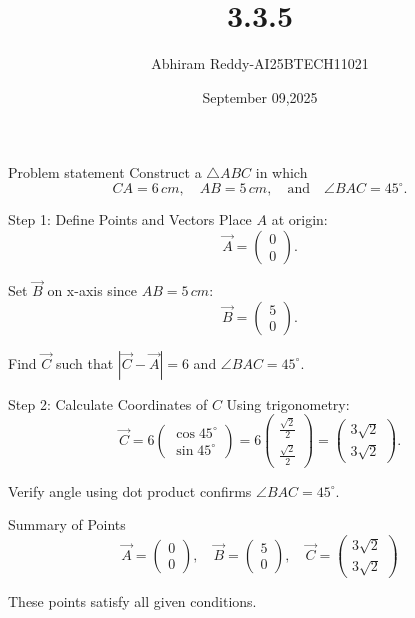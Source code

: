 \documentclass{beamer}
\title 
{3.3.5}
\date{September 09,2025}
\author 
{Abhiram Reddy-AI25BTECH11021}
\begin{document}
\frame{\titlepage}
\begin{frame}{Problem statement}
Construct a $\triangle ABC$ in which 
\[
CA = 6\,cm, \quad AB = 5\,cm, \quad \text{and} \quad \angle BAC = 45^\circ.
\]
\end{frame}

\begin{frame}{Step 1: Define Points and Vectors}
Place $A$ at origin: 
\[
\vec{A} = \begin{pmatrix}0 \\ 0\end{pmatrix}.
\]

Set $\vec{B}$ on x-axis since $AB=5\,cm$:
\[
\vec{B} = \begin{pmatrix}5 \\ 0\end{pmatrix}.
\]

Find $\vec{C}$ such that $|\vec{C}-\vec{A}|=6$ and $\angle BAC=45^\circ$.
\end{frame}

\begin{frame}{Step 2: Calculate Coordinates of $C$}
Using trigonometry:
\[
\vec{C} = 6 \begin{pmatrix} \cos 45^\circ \\ \sin 45^\circ \end{pmatrix} 
= 6 \begin{pmatrix} \frac{\sqrt{2}}{2} \\ \frac{\sqrt{2}}{2} \end{pmatrix} 
= \begin{pmatrix} 3\sqrt{2} \\ 3\sqrt{2} \end{pmatrix}.
\]

Verify angle using dot product confirms $\angle BAC = 45^\circ$.
\end{frame}

\begin{frame}{Summary of Points}
\[
\boxed{
\vec{A} = \begin{pmatrix}0 \\ 0\end{pmatrix}, \quad
\vec{B} = \begin{pmatrix}5 \\ 0\end{pmatrix}, \quad
\vec{C} = \begin{pmatrix}3\sqrt{2} \\ 3\sqrt{2}\end{pmatrix}
}
\]

These points satisfy all given conditions.
\end{frame}
\end{document}
